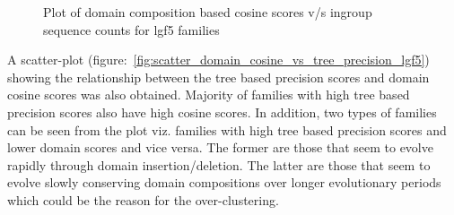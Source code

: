 \documentclass{article}
\begin{document}
		\begin{figure}
			\caption{Plot of domain composition based cosine scores v/s ingroup sequence counts for lgf5 families}
			\label{fig:scatter_domain_cosine_vs_seq_ct_lgf5}
		\end{figure}
		
		A scatter-plot (figure:~\ref{fig:scatter_domain_cosine_vs_tree_precision_lgf5}) showing the relationship between the tree based precision scores and domain cosine scores was also obtained. Majority of families with high tree based precision scores also have high cosine scores. In addition, two types of families can be seen from the plot viz. families with high tree based precision scores and lower domain scores and vice versa. The former are those that seem to evolve rapidly through domain insertion/deletion. The latter are those that seem to evolve slowly conserving domain compositions over longer evolutionary periods which could be the reason for the over-clustering.
		
\end{document}
